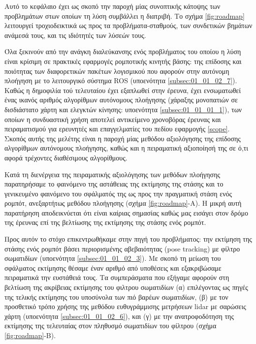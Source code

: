 Αυτό το κεφάλαιο έχει ως σκοπό την παροχή μίας συνοπτικής κάτοψης των
προβλημάτων στων οποίων τη λύση συμβάλλει η διατριβή. Το σχήμα
\ref{fig:roadmap} λειτουργεί τροχιοδεικτικά ως προς τα προβλήματα-σταθμούς,
των συνδετικών βημάτων ανάμεσά τους, και τις ιδιότητές των λύσεών τους.


Όλα ξεκινούν από την ανάγκη διαλεύκανσης ενός προβλήματος του οποίου η λύση
είναι κρίσιμη σε πρακτικές εφαρμογές ρομποτικής κινητής βάσης: της επίδοσης και
ποιότητας των διαφορετικών πακέτων λογισμικού που αφορούν στην αυτόνομη
πλοήγηση με το λειτουργικό σύστημα ROS (υποενότητα \ref{subsec:01_01_02_7}).
Καθώς η δημοφιλία τού τελευταίου έχει εξαπλωθεί στην έρευνα, έχει ενσωματωθεί
ένας ικανός αριθμός αλγορίθμων αυτόνομους πλοήγησης (χάραξης μονοπατιών σε
δισδιάστατο χάρτη και ελεγκτών κίνησης: υποενότητα \ref{subsec:01_01_01_1}),
των οποίων η συνδυαστική χρήση αποτελεί αντικείμενο χρονοβόρας έρευνας και
πειραματισμού για ερευνητές και επαγγελματίες του πεδίου εφαρμογής \ref{scope}.
Σκοπός αυτής της μελέτης είναι η παροχή μίας μεθόδου αξιολόγησης της επίδοσης
αλγορίθμων αυτόνομους πλοήγησης, καθώς και η πειραματική αξιοποίησή της σε ό,τι
αφορά τρέχοντες διαθέσιμους αλγορίθμους.

Κατά τη διενέργεια της πειραματικής αξιολόγησης των μεθόδων πλοήγησης
παρατηρήσαμε το φαινόμενο της αστάθειας της εκτίμησης της στάσης και το
γενικευμένο φαινόμενο του σφάλματός της ως προς την πραγματική στάση ενός
ρομπότ, ανεξαρτήτως μεθόδου πλοήγησης (σχήμα \ref{fig:roadmap}-Α). Η μικρή αυτή
παρατήρηση αποδεικνύεται ότι είναι καίριας σημασίας καθώς μας εισάγει στον
δρόμο της έρευνας επί της βελτίωσης της εκτίμησης της στάσης ενός ρομπότ.


Προς αυτόν το στόχο επικεντρωθήκαμε στην πηγή του προβλήματος: την εκτίμηση της
στάσης ενός ρομπότ βάσει περιορισμένης αβεβαιότητας (pose tracking) με φίλτρο
σωματιδίων (υποενότητα \ref{subsec:01_01_02_3}). Με σκοπό τη μείωση του
σφάλματος εκτίμησης θέσαμε έναν αριθμό από υποθέσεις και εξακριβώσαμε
πειραματικά την ευστάθειά τους. Τα συμπεράσματα που εξήγαμε αφορούν στη
βελτίωση της ακρίβειας εκτίμησης του φιλτρου σωματιδίων (α) επιλέγοντας ως
πηγές της τελικής εκτίμησης του υποσύνολα των πιό βαρέων σωματιδίων, (β) με τον
προσθετικό τρόπο χρήσης της μεθόδου ευθυγράμμισης μετρήσεων lidar με σαρώσεις
χάρτη (υποενότητα \ref{subsec:01_01_02_6}), και (γ) με την ανατροφοδότηση της
εκτίμησης της τελευταίας στον πληθυσμό σωματιδίων του φίλτρου (σχήμα
\ref{fig:roadmap}-Β).

